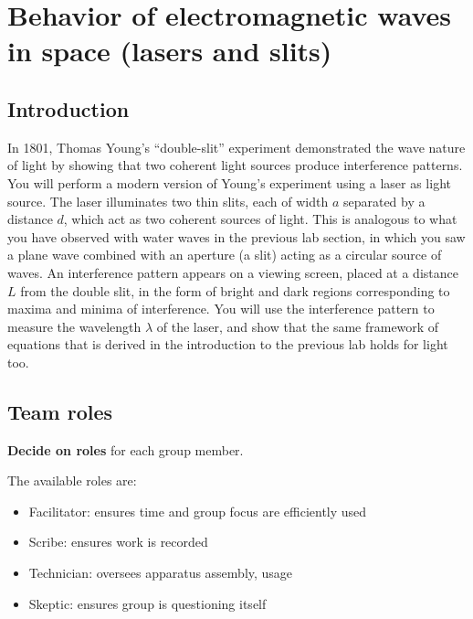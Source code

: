 \chapter{Behavior of electromagnetic waves in space (lasers and slits)}

\section{Introduction}

In 1801, Thomas Young's ``double-slit'' experiment demonstrated the wave nature of light by showing that two coherent light sources produce interference patterns. You will perform a modern version of Young's experiment using a
laser as light source. The laser illuminates two thin slits, each of width $a$ separated by a distance $d$, which act as two
coherent sources of light. This is analogous to what you have observed with water waves in the previous lab section, in
which you saw a plane wave combined with an aperture (a slit) acting as a circular source of waves. An interference
pattern appears on a viewing screen, placed at a distance $L$ from the double slit, in the form of bright and dark regions
corresponding to maxima and minima of interference. You will use the interference pattern to measure the wavelength
$\lambda$ of the laser, and show that the same framework of equations that is derived in the introduction to the previous lab
holds for light too.

%

\section{Team roles}

\begin{steps}
	\item \textbf{Decide on roles} for each group member.
\end{steps}

The available roles are:

\begin{itemize}
	\item Facilitator: ensures time and group focus are efficiently used
	\item Scribe: ensures work is recorded
	\item Technician: oversees apparatus assembly, usage
	\item Skeptic: ensures group is questioning itself
\end{itemize}

